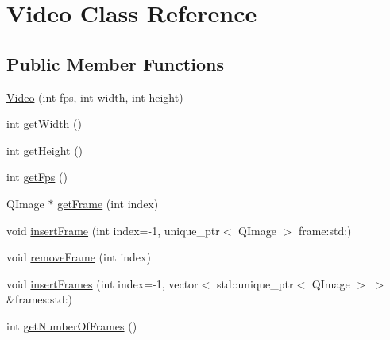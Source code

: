 \hypertarget{classGUI_1_1Player_1_1Video}{}\section{Video Class Reference}
\label{classGUI_1_1Player_1_1Video}
\subsection*{Public Member Functions}
\begin{DoxyCompactItemize}
\item 
\hyperlink{classGUI_1_1Player_1_1Video_ab82b351b35612f4226f75726d958831b}{Video} (int fps, int width, int height)
\item 
int \hyperlink{classGUI_1_1Player_1_1Video_a67a0997183f24da19b776d96c1052998}{get\+Width} ()
\item 
int \hyperlink{classGUI_1_1Player_1_1Video_a07efb2a4e9a982688c8bb3c3f21d1092}{get\+Height} ()
\item 
int \hyperlink{classGUI_1_1Player_1_1Video_a519ad5c0664b9de28c1a6d9dc77f959d}{get\+Fps} ()
\item 
Q\+Image $\ast$ \hyperlink{classGUI_1_1Player_1_1Video_aa350d9b9ba7bad72aeda171dcc537c10}{get\+Frame} (int index)
\item 
void \hyperlink{classGUI_1_1Player_1_1Video_a099c54fc35c34a3231a9b5a6d9fe6d18}{insert\+Frame} (int index=-\/1, unique\+\_\+ptr$<$ Q\+Image $>$ frame\+:std\+:)
\item 
void \hyperlink{classGUI_1_1Player_1_1Video_a2467a8d0c175fdcbacea59e9955d88a9}{remove\+Frame} (int index)
\item 
void \hyperlink{classGUI_1_1Player_1_1Video_ab77b9ebd7677bbb317c511fa48d61aa6}{insert\+Frames} (int index=-\/1, vector$<$ std\+::unique\+\_\+ptr$<$ Q\+Image $>$ $>$ \&frames\+:std\+:)
\item 
int \hyperlink{classGUI_1_1Player_1_1Video_a038091d64aa83552571228512789d5ee}{get\+Number\+Of\+Frames} ()
\end{DoxyCompactItemize}
